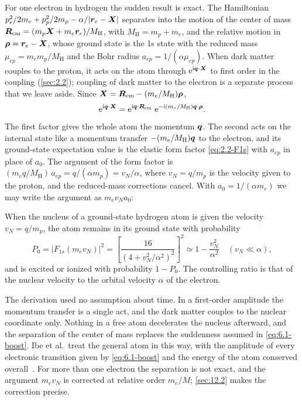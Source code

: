 For one electron in hydrogen the sudden result is exact. The Hamiltonian $p_e^2/2m_e + p_p^2/2m_p - \alpha/|\bm{r}_e - \bm{X}|$ separates into the motion of the center of mass $\bm{R}_{\mathrm{cm}} = (m_p\bm{X} + m_e\bm{r}_e)/M_{\mathrm{H}}$, with $M_{\mathrm{H}} = m_p + m_e$, and the relative motion in $\bm{\rho} = \bm{r}_e - \bm{X}$, whose ground state is the 1s state with the reduced mass $\mu_{ep} = m_em_p/M_{\mathrm{H}}$ and the Bohr radius $a_{ep} = 1/(\alpha\mu_{ep})$. When dark matter couples to the proton, it acts on the atom through $\mathrm{e}^{\mathrm{i}\bm{q}\cdot\bm{X}}$ to first order in the coupling (\cref{sec:2.2}); coupling of dark matter to the electron is a separate process that we leave aside. Since $\bm{X} = \bm{R}_{\mathrm{cm}} - (m_e/M_{\mathrm{H}})\bm{\rho}$,
\begin{equation*}
  \mathrm{e}^{\mathrm{i}\bm{q}\cdot\bm{X}} = \mathrm{e}^{\mathrm{i}\bm{q}\cdot\bm{R}_{\mathrm{cm}}}\;\mathrm{e}^{-\mathrm{i}(m_e/M_{\mathrm{H}})\bm{q}\cdot\bm{\rho}} .
\end{equation*}
The first factor gives the whole atom the momentum $\bm{q}$. The second acts on the internal state like a momentum transfer $-(m_e/M_{\mathrm{H}})\bm{q}$ to the electron, and its ground-state expectation value is the elastic form factor \cref{eq:2.2-F1s} with $a_{ep}$ in place of $a_0$. The argument of the form factor is $(m_eq/M_{\mathrm{H}})\,a_{ep} = q/(\alpha m_p) = v_N/\alpha$, where $v_N = q/m_p$ is the velocity given to the proton, and the reduced-mass corrections cancel. With $a_0 = 1/(\alpha m_e)$ we may write the argument as $m_ev_Na_0$:
\begin{keyresult}
When the nucleus of a ground-state hydrogen atom is given the velocity $v_N = q/m_p$, the atom remains in its ground state with probability
\begin{equation}
  P_0 = \bigl|F_{1s}(m_ev_N)\bigr|^2 = \left[\frac{16}{(4 + v_N^2/\alpha^2)^2}\right]^2 \simeq 1 - \frac{v_N^2}{\alpha^2} \quad (v_N \ll \alpha) ,
  \label{eq:6.1-P0}
\end{equation}
and is excited or ionized with probability $1 - P_0$. The controlling ratio is that of the nuclear velocity to the orbital velocity $\alpha$ of the electron.
\end{keyresult}
The derivation used no assumption about time. In a first-order amplitude the momentum transfer is a single act, and the dark matter couples to the nuclear coordinate only. Nothing in a free atom decelerates the nucleus afterward, and the separation of the center of mass replaces the suddenness assumed in \cref{eq:6.1-boost}. Ibe et al.\ treat the general atom in this way, with the amplitude of every electronic transition given by \cref{eq:6.1-boost} and the energy of the atom conserved overall~\cite[Eqs.~(55)--(58)]{ibe2018migdal}. For more than one electron the separation is not exact, and the argument $m_ev_N$ is corrected at relative order $m_e/M$; \cref{sec:12.2} makes the correction precise.

